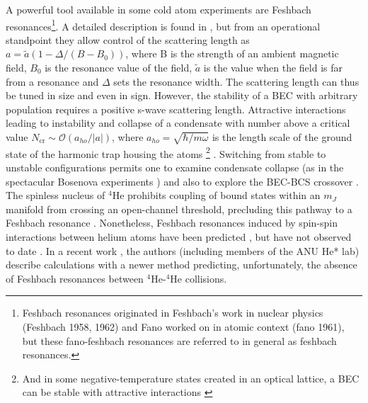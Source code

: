 	A powerful tool available in some cold atom experiments are Feshbach resonances\footnote{Feshbach resonances originated in Feshbach's work in nuclear physics (Feshbach 1958, 1962) and Fano worked on in atomic context (fano 1961), but these fano-feshbach resonances are referred to in general as feshbach resonances.
	}.
	A detailed description is found in \cite{Chin10}, but from an operational standpoint they allow control of the scattering length as $a = \tilde{a}(1-\Delta/(B-B_0))$, where B is the strength of an ambient magnetic field, $B_0$ is the resonance value of the field, $\tilde{a}$ is the value when the field is far from a resonance and $\Delta$ sets the resonance width.
	The scattering length can thus be tuned in size and even in sign.
	However, the stability of a BEC with arbitrary population requires a positive s-wave scattering length.
	Attractive interactions leading to instability and collapse of a condensate with number above a critical value $N_\textrm{cr}\sim\mathcal{O}(a_{ho}/|a|)$, where $a_{ho} = \sqrt{\hbar/m\omega}$ is the length scale of the ground state of the harmonic trap housing the atoms \footnote{And in some negative-temperature states created in an optical lattice, a BEC can be stable with attractive interactions \cite{Braun13}} \cite{PitaevskiiStringari}.
	Switching from stable to unstable configurations permits one to examine condensate collapse (as in the spectacular Bosenova experiments \cite{Cornish00}) and also to explore the BEC-BCS crossover \cite{Bourdel04}.
	The spinless nucleus of $^4$He prohibits coupling of bound states within an $m_J$ manifold from crossing an open-channel threshold, precluding this pathway to a Feshbach resonance \cite{Goosen10}.
	Nonetheless, Feshbach resonances induced by spin-spin interactions between helium atoms have been predicted \cite{Venturi99, Goosen10}, but have not observed to date \cite{Borbely12}.
	In a recent work \cite{Hirsch21}, the authors (including members of the ANU He* lab) describe calculations with a newer method predicting, unfortunately, the absence of Feshbach resonances between $^4$He-$^4$He collisions.
	
